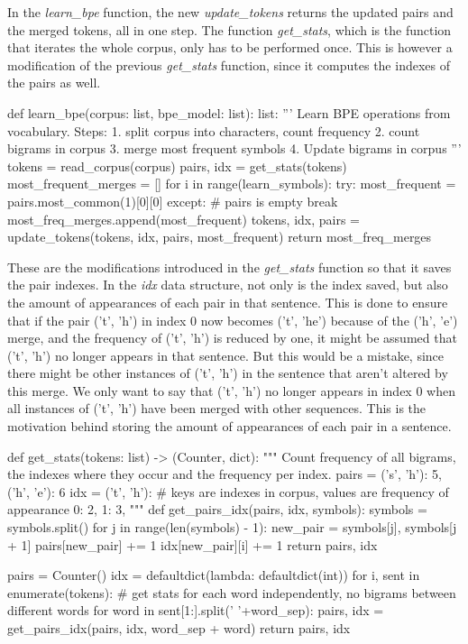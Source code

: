 In the \emph{learn\_bpe} function, the new \emph{update\_tokens} returns the updated pairs and the merged tokens, all in one step. The function \emph{get\_stats}, which is the function that iterates the whole corpus, only has to be performed once. This is however a modification of the previous \emph{get\_stats} function, since it computes the indexes of the pairs as well.

\begin{python}
def learn_bpe(corpus: list, bpe_model: list): list:
  '''
  Learn BPE operations from vocabulary.
  Steps:
  1. split corpus into characters, count frequency
  2. count bigrams in corpus
  3. merge most frequent symbols
  4. Update bigrams in corpus 
  '''
  tokens = read_corpus(corpus)
  pairs, idx = get_stats(tokens)
  most_frequent_merges = []
  for i in range(learn_symbols):
    try:
      most_frequent = pairs.most_common(1)[0][0]
    except:
      # pairs is empty
      break
    most_freq_merges.append(most_frequent)
    tokens, idx, pairs = update_tokens(tokens, idx, pairs, most_frequent)
  return most_freq_merges
\end{python}

These are the modifications introduced in the \emph{get\_stats} function so that it saves the pair indexes. In the \emph{idx} data structure, not only is the index saved, but also the amount of appearances of each pair in that sentence. This is done to ensure that if the pair ('t', 'h') in index 0 now becomes ('t', 'he') because of the ('h', 'e') merge, and the frequency of ('t', 'h') is reduced by one, it might be assumed that ('t', 'h') no longer appears in that sentence. But this would be a mistake, since there might be other instances of ('t', 'h') in the sentence that aren't altered by this merge. We only want to say that ('t', 'h') no longer appears in index 0 when all instances of ('t', 'h') have been merged with other sequences. This is the motivation behind storing the amount of appearances of each pair in a sentence.

\begin{python}
def get_stats(tokens: list) -> (Counter, dict):
  """
  Count frequency of all bigrams, the indexes where they occur and the frequency per index.
  pairs = {
      ('s', 'h'): 5,
      ('h', 'e'): 6
  }
  idx = {
      ('t', 'h'): {
          # keys are indexes in corpus, values are frequency of appearance
          0: 2,
          1: 3,
      }
  }
  """
  def get_pairs_idx(pairs, idx, symbols):
    symbols = symbols.split()
    for j in range(len(symbols) - 1):
      new_pair = symbols[j], symbols[j + 1]
      pairs[new_pair] += 1
      idx[new_pair][i] += 1
    return pairs, idx

  pairs = Counter()
  idx = defaultdict(lambda: defaultdict(int))
  for i, sent in enumerate(tokens):
    # get stats for each word independently, no bigrams between different words
    for word in sent[1:].split(' '+word_sep):
      pairs, idx = get_pairs_idx(pairs, idx, word_sep + word)
  return pairs, idx
\end{python}

